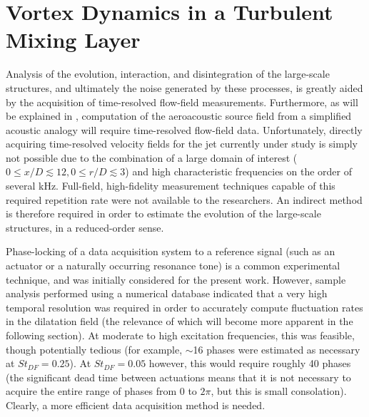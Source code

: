 \section{Vortex Dynamics in a Turbulent Mixing Layer}
\label{sect:velocity}
Analysis of the evolution, interaction, and disintegration of the large-scale structures, and ultimately the noise generated by these processes, is greatly aided by the acquisition of time-resolved flow-field measurements.
Furthermore, as will be explained in , computation of the aeroacoustic source field from a simplified acoustic analogy will require time-resolved flow-field data.
Unfortunately, directly acquiring time-resolved velocity fields for the jet currently under study is simply not possible due to the combination of a large domain of interest ($0 \leq x/D \lesssim 12, 0 \leq r/D \lesssim 3$) and high characteristic frequencies on the order of several kHz.
Full-field, high-fidelity measurement techniques capable of this required repetition rate were not available to the researchers.
An indirect method is therefore required in order to estimate the evolution of the large-scale structures, in a reduced-order sense.

Phase-locking of a data acquisition system to a reference signal (such as an actuator or a naturally occurring resonance tone) is a common experimental technique, and was initially considered for the present work.
However, sample analysis performed using a numerical database indicated that a very high temporal resolution was required in order to accurately compute fluctuation rates in the dilatation field (the relevance of which will become more apparent in the following section).
At moderate to high excitation frequencies, this was feasible, though potentially tedious (for example, $\sim$16 phases were estimated as necessary at $St_{DF} =0.25$).
At $St_{DF} =0.05$ however, this would require roughly 40 phases (the significant dead time between actuations means that it is not necessary to acquire the entire range of phases from $0$ to $2\pi$, but this is small consolation).
Clearly, a more efficient data acquisition method is needed.

